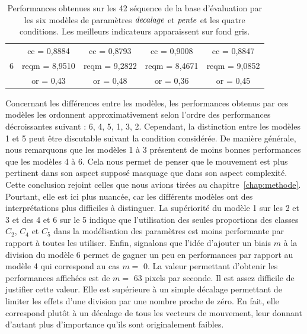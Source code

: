 \begin{table}[htbp]
\begin{tabular}{ccccc}
		& cc = 0,8884			& cc = 0,8793			& \cellcolor[gray]{0.6}cc = 0,9008 			& cc = 0,8847 					\\ \cmidrule{2-5}
6		& reqm = 8,9510		& reqm = 9,2822		& \cellcolor[gray]{0.6}reqm = 8,4671 	& reqm = 9,0852 			\\ \cmidrule{2-5}
		& or = 0,43				& or = 0,48				& or = 0,36 				& or = 0,45	 													\\ \bottomrule
\end{tabular}
\caption{Performances obtenues sur les 42 séquence de la base d'évaluation par les six modèles de paramètres $\mathit{decalage}$ et $\mathit{pente}$ et les quatre conditions. Les meilleurs indicateurs apparaissent sur fond gris.}
\label{tab:MQV1Perf}
\end{table}

Concernant les différences entre les modèles, les performances obtenus par ces modèles les ordonnent approximativement selon l'ordre des performances décroissantes suivant : 6, 4, 5, 1, 3, 2. Cependant, la distinction entre les modèles 1 et 5 peut être discutable suivant la condition considérée. De manière générale, nous remarquons que les modèles 1 à 3 présentent de moins bonnes performances que les modèles 4 à 6. Cela nous permet de penser que le mouvement est plus pertinent dans son aspect supposé masquage que dans son aspect complexité. Cette conclusion rejoint celles que nous avions tirées au chapitre~\ref{chap:methode}. Pourtant, elle est ici plus nuancée, car les différents modèles ont des interprétations plus difficiles à distinguer. La supériorité du modèle 1 sur les 2 et 3 et des 4 et 6 sur le 5 indique que l'utilisation des seules proportions des classes $C_2$, $C_4$ et $C_5$ dans la modélisation des paramètres est moins performante par rapport à toutes les utiliser. Enfin, signalons que l'idée d'ajouter un biais $m$ à la division du modèle 6 permet de gagner un peu en performances par rapport au modèle 4 qui correspond au cas $m =$ 0. La valeur permettant d'obtenir les performances affichées est de $m =$ 63 pixels par seconde. Il est assez difficile de justifier cette valeur. Elle est supérieure à un simple décalage permettant de limiter les effets d'une division par une nombre proche de zéro. En fait, elle correspond plutôt à un décalage de tous les vecteurs de mouvement, leur donnant d'autant plus d'importance qu'ils sont originalement faibles.

